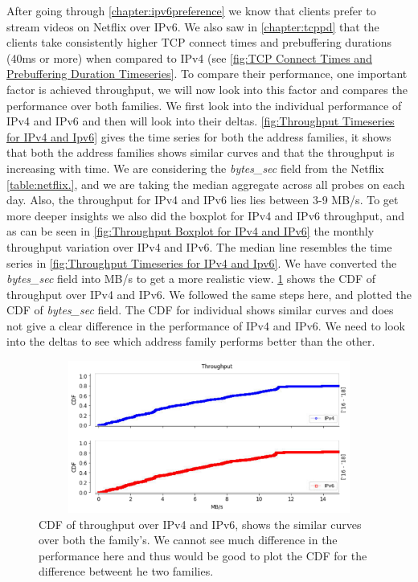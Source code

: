 After going through \cref{chapter:ipv6preference} we know that clients prefer to stream videos on Netflix over IPv6. We also saw in \cref{chapter:tcppd} that the clients take consistently higher TCP connect times and prebuffering durations
(40ms or more) when compared to IPv4 (see \cref{fig:TCP Connect Times and Prebuffering Duration Timeseries}. To compare their performance, one important factor is achieved throughput, we will now look into this factor and compares the performance over both families.
We first look into the individual performance of IPv4 and IPv6 and then will look into their deltas. \cref{fig:Throughput Timeseries for IPv4 and Ipv6} gives the time series for
both the address families, it shows that both the address families shows similar curves and that the throughput is increasing with time.
We are considering the \textit{bytes\_sec} field from the Netflix \cref{table:netflix.}, and we are taking the median aggregate across
all probes on each day. Also, the throughput for IPv4 and IPv6 lies lies between 3-9 MB/s. To get more deeper insights
we also did the boxplot for IPv4 and IPv6 throughput, and as can be seen in \cref{fig:Throughput Boxplot for IPv4 and IPv6} the monthly
throughput variation over IPv4 and IPv6. The median line resembles the time series in \cref{fig:Throughput Timeseries for IPv4 and Ipv6}. We have 
converted the \textit{bytes\_sec} field into MB/s to get a more realistic view. \cref{fig:Throughput CDF over IPv4 and IPv6} shows the CDF of
throughput over IPv4 and IPv6. We followed the same steps here,
and plotted the CDF of \textit{bytes\_sec} field. The CDF for individual shows similar curves and does not give a clear difference
in the performance of IPv4 and IPv6. 
We need to look into the deltas to see which address family performs better than the other.
 
\begin{figure}[!ht]
	\centering
	\includegraphics[keepaspectratio, height=5cm, width=15cm]{figures/throughput/netflix-throughput-difference-separate.pdf}
	\caption[Throughput CDF over IPv4 and IPv6]{CDF of throughput over IPv4 and IPv6, shows the similar curves over both the family's. We cannot see much difference in the performance here and thus would be good to plot the CDF for the difference betweent he two families.}
	\label{fig:Throughput CDF over IPv4 and IPv6}
\end{figure}
\FloatBarrier

